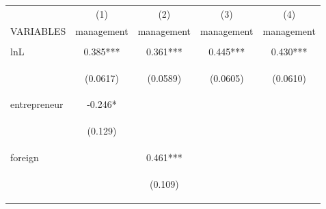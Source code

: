 \begin{center}
\begin{tabular}{lcccc} \hline
 & (1) & (2) & (3) & (4) \\
VARIABLES & management & management & management & management \\ \hline
\vspace{4pt} & \begin{footnotesize}\end{footnotesize} & \begin{footnotesize}\end{footnotesize} & \begin{footnotesize}\end{footnotesize} & \begin{footnotesize}\end{footnotesize} \\
lnL & 0.385*** & 0.361*** & 0.445*** & 0.430*** \\
\vspace{4pt} & \begin{footnotesize}(0.0617)\end{footnotesize} & \begin{footnotesize}(0.0589)\end{footnotesize} & \begin{footnotesize}(0.0605)\end{footnotesize} & \begin{footnotesize}(0.0610)\end{footnotesize} \\
entrepreneur & -0.246* &  &  &  \\
\vspace{4pt} & \begin{footnotesize}(0.129)\end{footnotesize} & \begin{footnotesize}\end{footnotesize} & \begin{footnotesize}\end{footnotesize} & \begin{footnotesize}\end{footnotesize} \\
foreign &  & 0.461*** &  &  \\
\vspace{4pt} & \begin{footnotesize}\end{footnotesize} & \begin{footnotesize}(0.109)\end{footnotesize} & \begin{footnotesize}\end{footnotesize} & \begin{footnotesize}\end{footnotesize} \\

\end{tabular}
\end{center}

